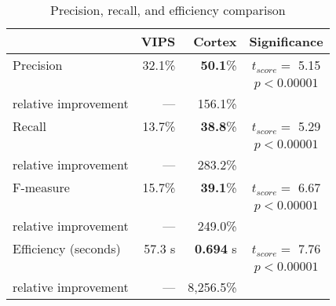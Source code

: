 \begin{table}
	\caption{Precision, recall, and efficiency comparison}
	\centering
	\begin{threeparttable}
		\bgroup
		\begin{tabular}{l r r c}
			\toprule
											& \textbf{VIPS}		& \textbf{Cortex}  & \textbf{Significance} 	\\
			\toprule
			Precision          				& 32.1\%            & \textbf{50.1}\%  & $t_{score} = $ 5.15    \\
											& 					& 				   & $p < 0.00001$ 			\\
			relative improvement          	& ---               & 156.1\%          & \ 						\\
			\midrule 
			Recall         					& 13.7\%            & \textbf{38.8}\%  & $t_{score} = $ 5.29    \\
											& 					& 				   & $p < 0.00001$ 			\\
			
			relative improvement         	& ---               & 283.2\%          & \ 						\\
			\midrule
			F-measure         				& 15.7\%            & \textbf{39.1}\%  & $t_{score} = $ 6.67    \\
											& 					& 				   & $p < 0.00001$ 			\\

			relative improvement          	& ---               & 249.0\%          & \   					\\
			\midrule
			Efficiency (seconds)  			& 57.3 s            & \textbf{0.694} s & $t_{score} = $ 7.76    \\
											& 					& 				   & $p < 0.00001$ 			\\
			relative improvement          	& ---               & 8,256.5\%        & \   					\\
			\bottomrule

		\end{tabular}
		\egroup
	\end{threeparttable}
	\label{tbl:results-summary}
\end{table}
